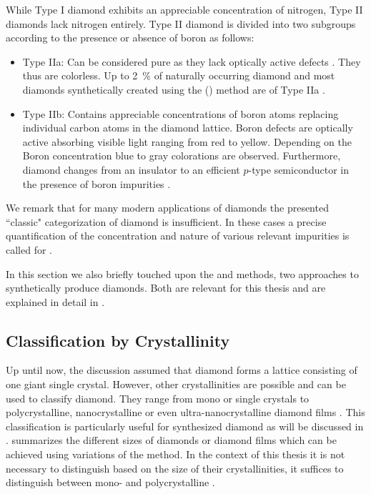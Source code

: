     While Type I diamond exhibits an appreciable concentration of nitrogen, Type II diamonds lack nitrogen entirely. Type II diamond is divided into two subgroups according to the presence or absence of boron as follows:

    \begin{itemize}
      \item Type IIa: Can be considered pure as they lack optically active defects \cite{Walker1979}. They thus are colorless. Up to \SI{2}{\percent} of naturally occurring diamond and most diamonds synthetically created using the \cvd (\CVD) method are of Type IIa \cite{Zaitsev2001}.
      \item Type IIb: Contains appreciable concentrations of boron atoms replacing individual carbon atoms in the diamond lattice. Boron defects are optically active absorbing visible light ranging from red to yellow. Depending on the Boron concentration blue to gray colorations are observed. Furthermore, diamond changes from an insulator to an efficient $p$-type semiconductor in the presence of boron impurities \cite{Massarani1978}.
    \end{itemize}

    We remark that for many modern applications of diamonds the presented ``classic" categorization of diamond is insufficient. In these cases a precise quantification of the concentration and nature of various relevant impurities is called for \cite{Markham2011, Balasubramanian2009}.

    In this section we also briefly touched upon the \CVD and \HPHT methods, two approaches to synthetically produce diamonds. Both are relevant for this thesis and are explained in detail in .

  \subsection{Classification by Crystallinity}

    Up until now, the discussion assumed that diamond forms a lattice consisting of one giant single crystal. However, other crystallinities are possible and can be used to classify diamond.
    They range from mono or single crystals to polycrystalline, nanocrystalline or even ultra-nanocrystalline diamond films \cite{May2000}. This classification is particularly useful for synthesized diamond as will be discussed in .  summarizes the different sizes of diamonds or diamond films which can be achieved using variations of the \CVD method. In the context of this thesis it is not necessary to distinguish \nds based on the size of their crystallinities, it suffices to distinguish between mono- and polycrystalline \nds. 

